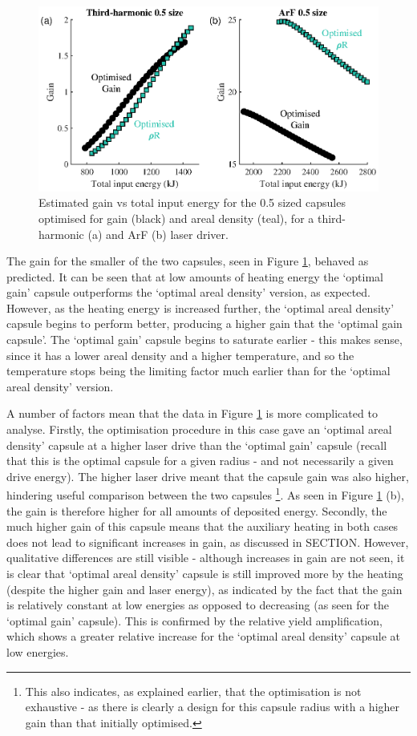 \begin{figure}[ht]
\centering
\includegraphics{figures/FurtherSims/OptimisedRhoR.eps}
\caption{Estimated gain vs total input energy for the 0.5 sized capsules optimised for gain (black) and areal density (teal), for a third-harmonic (a) and ArF (b) laser driver.}
\label{fig:OptimisedRhoR}
\end{figure}

The gain for the smaller of the two capsules, seen in Figure \ref{fig:OptimisedRhoR}, behaved as predicted. It can be seen that at low amounts of heating energy the `optimal gain' capsule outperforms the `optimal areal density' version, as expected. However, as the heating energy is increased further, the `optimal areal density' capsule begins to perform better, producing a higher gain that the `optimal gain capsule'. The `optimal gain' capsule begins to saturate earlier - this makes sense, since it has a lower areal density and a higher temperature, and so the temperature stops being the limiting factor much earlier than for the `optimal areal density' version.

A number of factors mean that the data in Figure \ref{fig:OptimisedRhoR} is more complicated to analyse. Firstly, the optimisation procedure in this case gave an `optimal areal density' capsule at a higher laser drive than the `optimal gain' capsule (recall that this is the optimal capsule for a given radius - and not necessarily a given drive energy). The higher laser drive meant that the capsule gain was also higher, hindering useful comparison between the two capsules \footnote{This also indicates, as explained earlier, that the optimisation is not exhaustive - as there is clearly a design for this capsule radius with a higher gain than that initially optimised.}. As seen in Figure \ref{fig:OptimisedRhoR} (b), the gain is therefore higher for all amounts of deposited energy. Secondly, the much higher gain of this capsule means that the auxiliary heating in both cases does not lead to significant increases in gain, as discussed in SECTION. However, qualitative differences are still visible - although increases in gain are not seen, it is clear that `optimal areal density' capsule is still improved more by the heating (despite the higher gain and laser energy), as indicated by the fact that the gain is relatively constant at low energies as opposed to decreasing (as seen for the `optimal gain' capsule). This is confirmed by the relative yield amplification, which shows a greater relative increase for the `optimal areal density' capsule at low energies.


